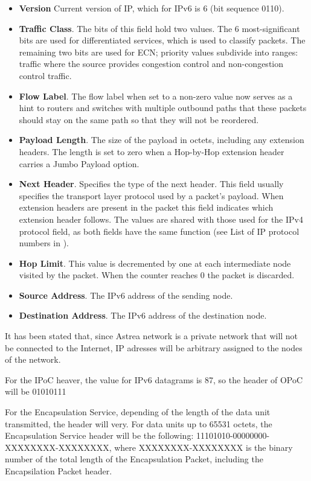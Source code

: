 \begin{itemize}
\item \textbf{Version} Current version of IP, which for IPv6 is 6 (bit sequence 0110).
\item \textbf{Traffic Class}. The bits of this field hold two values. The 6 most-significant bits are used for differentiated services, which is used to classify packets. The remaining two bits are used for ECN; priority values subdivide into ranges: traffic where the source provides congestion control and non-congestion control traffic.
\item \textbf{Flow Label}. The flow label when set to a non-zero value now serves as a hint to routers and switches with multiple outbound paths that these packets should stay on the same path so that they will not be reordered.
\item \textbf{Payload Length}. The size of the payload in octets, including any extension headers. The length is set to zero when a Hop-by-Hop extension header carries a Jumbo Payload option.
\item \textbf{Next Header}. Specifies the type of the next header. This field usually specifies the transport layer protocol used by a packet's payload. When extension headers are present in the packet this field indicates which extension header follows. The values are shared with those used for the IPv4 protocol field, as both fields have the same function (see List of IP protocol numbers in \cite{IANAPN}).
\item \textbf{Hop Limit}. This value is decremented by one at each intermediate node visited by the packet. When the counter reaches 0 the packet is discarded.
\item \textbf{Source Address}. The IPv6 address of the sending node.
\item \textbf{Destination Address}. The IPv6 address of the destination node.
\end{itemize}

It has been stated that, since Astrea network is a private network that will not be connected to the Internet, IP adresses will be arbitrary assigned to the nodes of the network.

For the IPoC heaver, the value for IPv6 datagrams is 87, so the header of OPoC will be 01010111

For the Encapsulation Service, depending of the length of the data unit transmitted, the header will very. For data units up to 65531 octets, the Encapsulation Service header will be the following: 11101010-00000000-XXXXXXXX-XXXXXXXX, where XXXXXXXX-XXXXXXXX is the binary number of the total length of the Encapsulation Packet, including the Encapsilation Packet header.